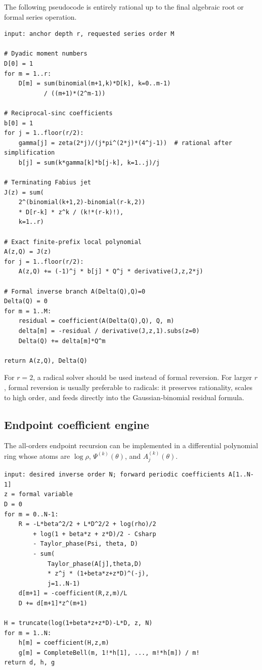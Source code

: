 \documentclass[11pt,oneside]{article}
\numberwithin{equation}{section}
\theoremstyle{definition}
\theoremstyle{remark}
\begin{document}
The following pseudocode is entirely rational up to the final algebraic root or formal
series operation.

\begin{lstlisting}[style=pseudo,caption={Exact construction of the local polynomial and inverse germ.},label={lst:dyadic-germ}]
input: anchor depth r, requested series order M

# Dyadic moment numbers
D[0] = 1
for m = 1..r:
    D[m] = sum(binomial(m+1,k)*D[k], k=0..m-1)
           / ((m+1)*(2^m-1))

# Reciprocal-sinc coefficients
b[0] = 1
for j = 1..floor(r/2):
    gamma[j] = zeta(2*j)/(j*pi^(2*j)*(4^j-1))  # rational after simplification
    b[j] = sum(k*gamma[k]*b[j-k], k=1..j)/j

# Terminating Fabius jet
J(z) = sum(
    2^(binomial(k+1,2)-binomial(r-k,2))
    * D[r-k] * z^k / (k!*(r-k)!),
    k=1..r)

# Exact finite-prefix local polynomial
A(z,Q) = J(z)
for j = 1..floor(r/2):
    A(z,Q) += (-1)^j * b[j] * Q^j * derivative(J,z,2*j)

# Formal inverse branch A(Delta(Q),Q)=0
Delta(Q) = 0
for m = 1..M:
    residual = coefficient(A(Delta(Q),Q), Q, m)
    delta[m] = -residual / derivative(J,z,1).subs(z=0)
    Delta(Q) += delta[m]*Q^m

return A(z,Q), Delta(Q)
\end{lstlisting}

For $r=2$, a radical solver should be used instead of formal reversion.  For larger $r$,
formal reversion is usually preferable to radicals: it preserves rationality, scales to high
order, and feeds directly into the Gaussian-binomial residual formula.

\subsection{Endpoint coefficient engine}

The all-orders endpoint recursion can be implemented in a differential polynomial ring whose
atoms are $\log\rho$, $\Psi^{(k)}(\theta)$, and $A_j^{(k)}(\theta)$.

\begin{lstlisting}[style=pseudo,caption={Lambert--Bell inverse coefficient engine.},label={lst:endpoint-engine}]
input: desired inverse order N; forward periodic coefficients A[1..N-1]
z = formal variable
D = 0
for m = 0..N-1:
    R = -L*beta^2/2 + L*D^2/2 + log(rho)/2
        + log(1 + beta*z + z*D)/2 - Csharp
        - Taylor_phase(Psi, theta, D)
        - sum(
            Taylor_phase(A[j],theta,D)
            * z^j * (1+beta*z+z*D)^(-j),
            j=1..N-1)
    d[m+1] = -coefficient(R,z,m)/L
    D += d[m+1]*z^(m+1)

H = truncate(log(1+beta*z+z*D)-L*D, z, N)
for m = 1..N:
    h[m] = coefficient(H,z,m)
    g[m] = CompleteBell(m, 1!*h[1], ..., m!*h[m]) / m!
return d, h, g
\end{lstlisting}
\end{document}
